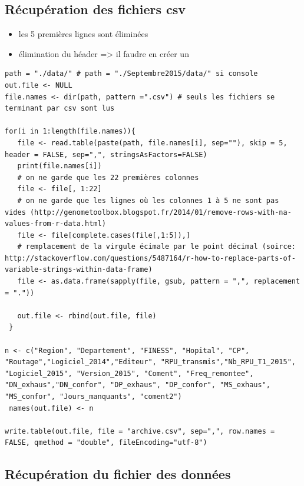 \documentclass[]{article}
\begin{document}
\subsection{Récupération des fichiers
csv}\label{recuperation-des-fichiers-csv}

\begin{itemize}
\itemsep1pt\parskip0pt
\item
  les 5 premières lignes sont éliminées
\item
  élimination du héader =\textgreater{} il faudre en créer un
\end{itemize}

\begin{verbatim}
path = "./data/" # path = "./Septembre2015/data/" si console
out.file <- NULL
file.names <- dir(path, pattern =".csv") # seuls les fichiers se terminant par csv sont lus

for(i in 1:length(file.names)){
   file <- read.table(paste(path, file.names[i], sep=""), skip = 5, header = FALSE, sep=",", stringsAsFactors=FALSE)
   print(file.names[i])
   # on ne garde que les 22 premières colonnes
   file <- file[, 1:22]
   # on ne garde que les lignes où les colonnes 1 à 5 ne sont pas vides (http://genometoolbox.blogspot.fr/2014/01/remove-rows-with-na-values-from-r-data.html)
   file <- file[complete.cases(file[,1:5]),]
   # remplacement de la virgule écimale par le point décimal (soirce: http://stackoverflow.com/questions/5487164/r-how-to-replace-parts-of-variable-strings-within-data-frame)
   file <- as.data.frame(sapply(file, gsub, pattern = ",", replacement = "."))

   out.file <- rbind(out.file, file)
 }

n <- c("Region", "Departement", "FINESS", "Hopital", "CP", "Routage","Logiciel_2014","Editeur", "RPU_transmis","Nb_RPU_T1_2015", "Logiciel_2015", "Version_2015", "Coment", "Freq_remontee", "DN_exhaus","DN_confor", "DP_exhaus", "DP_confor", "MS_exhaus", "MS_confor", "Jours_manquants", "coment2")
 names(out.file) <- n

write.table(out.file, file = "archive.csv", sep=",", row.names = FALSE, qmethod = "double", fileEncoding="utf-8")
\end{verbatim}

\subsection{Récupération du fichier des
données}\label{recuperation-du-fichier-des-donnees}
\end{document}
